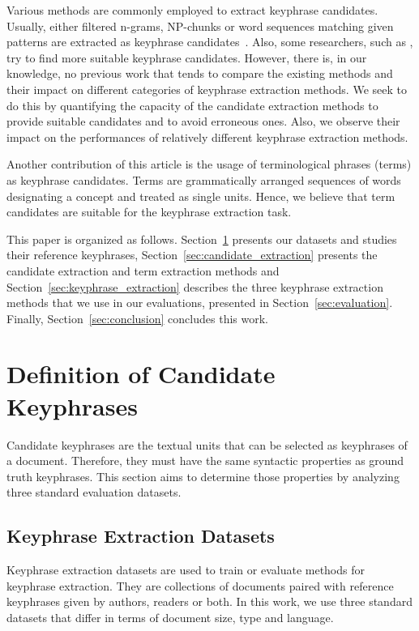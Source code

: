   Various methods are commonly employed to extract keyphrase candidates.
  Usually, either filtered n-grams, NP-chunks or word sequences matching given
  patterns are extracted as keyphrase
  candidates~\cite{hulth2003keywordextraction}. Also, some researchers, such as
  , try to find more
  suitable keyphrase candidates. However, there is, in our knowledge, no
  previous work that tends to compare the existing methods and their impact on
  different categories of keyphrase extraction methods. We seek to do this by
  quantifying the capacity of the candidate extraction methods to provide
  suitable candidates and to avoid erroneous ones. Also, we observe their impact
  on the performances of relatively different keyphrase extraction methods.

  Another contribution of this article is the usage of terminological phrases
  (terms) as keyphrase candidates. Terms are grammatically arranged sequences of
  words designating a concept and treated as single units. Hence, we believe
  that term candidates are suitable for the keyphrase extraction task.

  This paper is organized as follows.
  Section~\ref{sec:definition_of_candidate_keyphrases} presents our datasets and
  studies their reference keyphrases, Section~\ref{sec:candidate_extraction}
  presents the candidate extraction and term extraction methods and
  Section~\ref{sec:keyphrase_extraction} describes the three keyphrase
  extraction methods that we use in our evaluations, presented in
  Section~\ref{sec:evaluation}. Finally,
  Section~\ref{sec:conclusion} concludes this work.

\section{Definition of Candidate Keyphrases}
\label{sec:definition_of_candidate_keyphrases}
  Candidate keyphrases are the textual units that can be selected as keyphrases
  of a document. Therefore, they must have the same syntactic properties as
  ground truth keyphrases. This section aims to determine those properties by
  analyzing three standard evaluation datasets.

  \subsection{Keyphrase Extraction Datasets}
  \label{subsec:keyphrase_extraction_datasets}
    Keyphrase extraction datasets are used to train or evaluate methods for
    keyphrase extraction. They are collections of documents paired with
    reference keyphrases given by authors, readers or both. In this work, we use
    three standard datasets that differ in terms of document size,  type and
    language.


